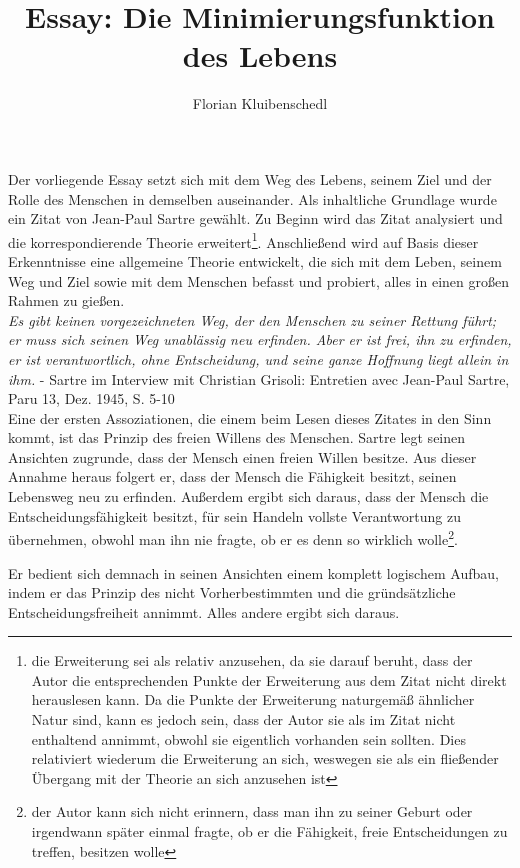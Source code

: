 \documentclass[12pt,a4paper,oneside]{article}
\author{Florian Kluibenschedl}
\title{Essay: Die Minimierungsfunktion des Lebens}
\begin{document}
  \maketitle
  
  Der vorliegende Essay setzt sich mit dem Weg des Lebens, seinem Ziel und der Rolle des Menschen in demselben auseinander. Als inhaltliche Grundlage wurde ein Zitat von Jean-Paul Sartre gewählt. Zu Beginn wird das Zitat analysiert und die korrespondierende Theorie erweitert\footnote{die Erweiterung sei als relativ anzusehen, da sie darauf beruht, dass der Autor die entsprechenden Punkte der Erweiterung aus dem Zitat nicht direkt herauslesen kann. Da die Punkte der Erweiterung naturgemäß ähnlicher Natur sind, kann es jedoch sein, dass der Autor sie als im Zitat nicht enthaltend annimmt, obwohl sie eigentlich vorhanden sein sollten. Dies relativiert wiederum die Erweiterung an sich, weswegen sie als ein fließender Übergang mit der Theorie an sich anzusehen ist}. Anschließend wird auf Basis dieser Erkenntnisse eine allgemeine Theorie entwickelt, die sich mit dem Leben, seinem Weg und Ziel sowie mit dem Menschen befasst und probiert, alles in einen großen Rahmen zu gießen. \\
  
  \textit{\glqq Es gibt keinen vorgezeichneten Weg, der den Menschen zu seiner Rettung führt; er muss sich seinen Weg unablässig neu erfinden. Aber er ist frei, ihn zu erfinden, er ist verantwortlich, ohne Entscheidung, und seine ganze Hoffnung liegt allein in ihm.\grqq} - Sartre im Interview mit Christian Grisoli: \glqq Entretien avec Jean-Paul Sartre\grqq , Paru 13, Dez. 1945, S. 5-10 \\
  
  Eine der ersten Assoziationen, die einem beim Lesen dieses Zitates in den Sinn kommt, ist das Prinzip des freien Willens des Menschen. Sartre legt seinen Ansichten zugrunde, dass der Mensch einen freien Willen besitze. Aus dieser Annahme heraus folgert er, dass der Mensch die Fähigkeit besitzt, seinen Lebensweg neu zu erfinden. Außerdem ergibt sich daraus, dass der Mensch die Entscheidungsfähigkeit besitzt, für sein Handeln vollste Verantwortung zu übernehmen, obwohl man ihn nie fragte, ob er es denn so wirklich wolle\footnote{der Autor kann sich nicht erinnern, dass man ihn zu seiner Geburt oder irgendwann später einmal fragte, ob er die Fähigkeit, freie Entscheidungen zu treffen, besitzen wolle}. 
  
  Er bedient sich demnach in seinen Ansichten einem komplett logischem Aufbau, indem er das Prinzip des nicht Vorherbestimmten und die gründsätzliche Entscheidungsfreiheit annimmt. Alles andere ergibt sich daraus. \\
  
\end{document}
